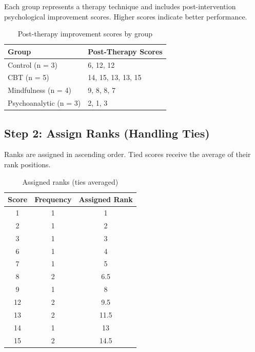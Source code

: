 \documentclass[a4paper,fleqn,review]{cas-sc}
\begin{document}
Each group represents a therapy technique and includes post-intervention psychological improvement scores. Higher scores indicate better performance.

\begin{table}[!htbp]
	\centering
	\renewcommand{\arraystretch}{1.3}
	\begin{tabular}{|l|l|}
		\hline
		\textbf{Group} & \textbf{Post-Therapy Scores} \\
		\hline
		Control (n = 3) & 6, 12, 12 \\
		CBT (n = 5) & 14, 15, 13, 13, 15 \\
		Mindfulness (n = 4) & 9, 8, 8, 7 \\
		Psychoanalytic (n = 3) & 2, 1, 3 \\
		\hline
	\end{tabular}
	\caption{Post-therapy improvement scores by group}
\end{table}

\vspace{1em}

\subsection*{Step 2: Assign Ranks (Handling Ties)}

Ranks are assigned in ascending order. Tied scores receive the average of their rank positions.

\begin{table}[!htbp]
	\centering
	\renewcommand{\arraystretch}{1.3}
	\begin{tabular}{|c|c|c|}
		\hline
		\textbf{Score} & \textbf{Frequency} & \textbf{Assigned Rank} \\
		\hline
		1 & 1 & 1 \\
		2 & 1 & 2 \\
		3 & 1 & 3 \\
		6 & 1 & 4 \\
		7 & 1 & 5 \\
		8 & 2 & 6.5 \\
		9 & 1 & 8 \\
		12 & 2 & 9.5 \\
		13 & 2 & 11.5 \\
		14 & 1 & 13 \\
		15 & 2 & 14.5 \\
		\hline
	\end{tabular}
	\caption{Assigned ranks (ties averaged)}
\end{table}

\vspace{1em}
\end{document}
